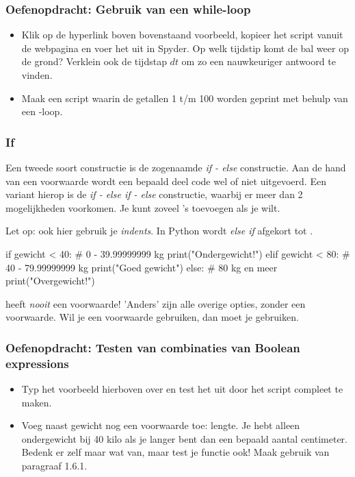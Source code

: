 \documentclass[a4paper,11pt, fleqn]{article}
\begin{document}
\subsubsection*{Oefenopdracht: Gebruik van een while-loop}
\begin{itemize}
	\item Klik op de hyperlink boven bovenstaand voorbeeld, kopieer het script vanuit de webpagina en voer het uit in Spyder. Op welk tijdstip komt de bal weer op de grond? Verklein ook de tijdstap $dt$ om zo een nauwkeuriger antwoord te vinden.
	\item Maak een script waarin de getallen 1 t/m 100 worden geprint met behulp van een -loop.
\end{itemize}

\subsubsection{If}
Een tweede soort constructie is de zogenaamde \textit{if - else} constructie. Aan de hand van een voorwaarde wordt een bepaald deel code wel of niet uitgevoerd. Een variant hierop is de \textit{if - else if - else} constructie, waarbij er meer dan 2 mogelijkheden voorkomen. Je kunt zoveel 's toevoegen als je wilt.

Let op: ook hier gebruik je \textit{indents}. In Python wordt \textit{else if} afgekort tot . 

\begin{python}
if gewicht < 40:            # 0 - 39.99999999 kg
    print("Ondergewicht!")
elif gewicht < 80:          # 40 - 79.99999999 kg
    print("Goed gewicht")
else:                       # 80 kg en meer
    print("Overgewicht!")
\end{python}

 heeft {\it nooit} een voorwaarde! 'Anders' zijn alle overige opties, zonder een voorwaarde. Wil je een voorwaarde gebruiken, dan moet je  gebruiken.


\subsubsection*{Oefenopdracht: Testen van combinaties van Boolean expressions} 
\begin{itemize}
	\item Typ het voorbeeld hierboven over en test het uit door het script compleet te maken. 
	\item Voeg naast gewicht nog een voorwaarde toe: lengte. Je hebt alleen ondergewicht bij 40 kilo als je langer bent dan een bepaald aantal centimeter. Bedenk er zelf maar wat van, maar test je functie ook! Maak gebruik van paragraaf 1.6.1.
\end{itemize}
\end{document}
